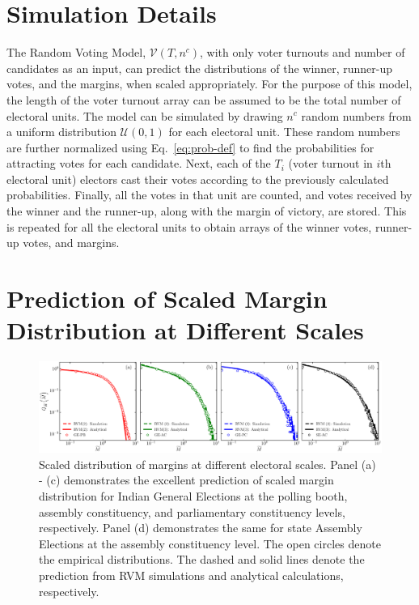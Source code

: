 \documentclass[reprint, pre, twocolumn, aps, showpacs, superscriptaddress]{revtex4-2}
\begin{document}
\section{Simulation Details}
\noindent The Random Voting Model, $\mathcal{V}{\left(T, n^c\right)}$, with only voter turnouts and number of candidates as an input, can predict the distributions of the winner, runner-up votes, and the margins, when scaled appropriately. For the purpose of this model, the length of the voter turnout array can be assumed to be the total number of electoral units. The model can be simulated by drawing $n^c$ random numbers from a uniform distribution $\mathcal{U}(0, 1)$ for each electoral unit. These random numbers are further normalized using Eq.~\ref{eq:prob-def} to find the probabilities for attracting votes for each candidate. Next, each of the $T_i$ (voter turnout in $i$th electoral unit) electors cast their votes according to the previously calculated probabilities. Finally, all the votes in that unit are counted, and votes received by the winner and the runner-up, along with the margin of victory, are stored. This is repeated for all the electoral units to obtain arrays of the winner votes, runner-up votes, and margins.




\section{Prediction of Scaled Margin Distribution at Different Scales}
\begin{figure}[ht!]
    \centering
    \includegraphics[width=1\linewidth]{fig_1_supp.pdf}
    \caption{Scaled distribution of margins at different electoral scales. Panel (a) - (c) demonstrates the excellent prediction of scaled margin distribution for Indian General Elections at the polling booth, assembly constituency, and parliamentary constituency levels, respectively. Panel (d) demonstrates the same for state Assembly Elections at the assembly constituency level. The open circles denote the empirical distributions. The dashed and solid lines denote the prediction from RVM simulations and analytical calculations, respectively.}
    \label{fig:s1}
\end{figure}
\newpage
\end{document}
